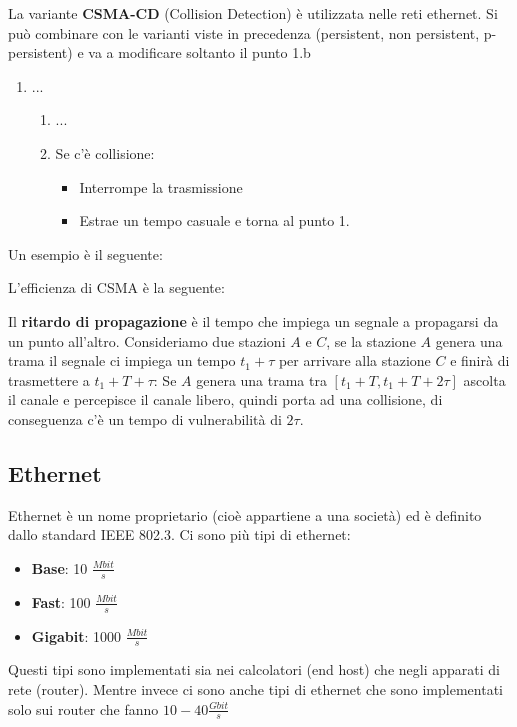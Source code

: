 \documentclass[a4paper]{article}
\begin{document}
\vspace{1em}
\noindent
La variante \textbf{CSMA-CD} (Collision Detection) è utilizzata nelle reti ethernet.
Si può combinare con le varianti viste in precedenza (persistent, non persistent, p-persistent)
e va a modificare soltanto il punto 1.b
\begin{enumerate}
  \item ...
    \begin{enumerate}
      \item ...
      \item Se c'è collisione:
        \begin{itemize}
          \item Interrompe la trasmissione
          \item Estrae un tempo casuale e torna al punto 1.
        \end{itemize}
    \end{enumerate}
\end{enumerate}

\begin{example}
  Un esempio è il seguente:
  \label{04-12-D8}
\end{example}

\vspace{1em}
\noindent
L'efficienza di CSMA è la seguente:
\label{04-12-D9}

\vspace{1em}
\noindent
Il \textbf{ritardo di propagazione} è il tempo che impiega un segnale a propagarsi
da un punto all'altro. Consideriamo due stazioni \( A \) e \( C \), se la stazione
\( A \) genera una trama il segnale ci impiega un tempo \( t_1 + \tau \) per arrivare
alla stazione \( C \) e finirà di trasmettere a \( t_1 + T + \tau \):
\label{04-12-D10}
Se \( A \) genera una trama tra \( [t_1+T,t_1+T+2\tau] \) ascolta il canale e percepisce
il canale libero, quindi porta ad una collisione, di conseguenza c'è un tempo di 
vulnerabilità di \( 2\tau \).

\subsection{Ethernet}
Ethernet è un nome proprietario (cioè appartiene a una società) ed è definito dallo
standard IEEE 802.3. Ci sono più tipi di ethernet:
\begin{itemize}
  \item \textbf{Base}: 10 \( \frac{Mbit}{s} \) 
  \item \textbf{Fast}: 100 \( \frac{Mbit}{s} \)
  \item \textbf{Gigabit}: 1000 \( \frac{Mbit}{s} \)
\end{itemize}
Questi tipi sono implementati sia nei calcolatori (end host) che negli apparati
di rete (router). Mentre invece ci sono anche tipi di ethernet che sono implementati
solo sui router che fanno \( 10-40 \frac{Gbit}{s} \) 
\end{document}
